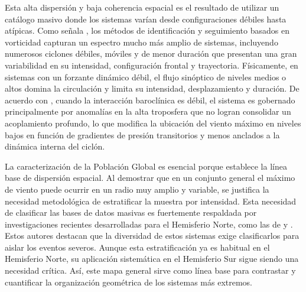 Esta alta dispersión y baja coherencia espacial es el resultado de utilizar un catálogo masivo donde los sistemas varían desde configuraciones débiles hasta atípicas. Como señala \citet{sinclair1994objective}, los métodos de identificación y seguimiento basados en vorticidad capturan un espectro mucho más amplio de sistemas, incluyendo numerosos ciclones débiles, móviles y de menor duración que presentan una gran variabilidad en su intensidad, configuración frontal y trayectoria. Físicamente, en sistemas con un forzante dinámico débil, el flujo sinóptico de niveles medios o altos domina la circulación y limita su intensidad, desplazamiento y duración. De acuerdo con \citet{hoskins2005new}, cuando la interacción baroclínica es débil, el sistema es gobernado principalmente por anomalías en la alta troposfera que no logran consolidar un acoplamiento profundo, lo que modifica la ubicación del viento máximo en niveles bajos en función de gradientes de presión transitorios y menos anclados a la dinámica interna del ciclón.

La caracterización de la Población Global es esencial porque establece la línea base de dispersión espacial. Al demostrar que en un conjunto general el máximo de viento puede ocurrir en un radio muy amplio y variable, se justifica la necesidad metodológica de estratificar la muestra por intensidad. Esta necesidad de clasificar las bases de datos masivas es fuertemente respaldada por investigaciones recientes desarrolladas para el Hemisferio Norte, como las de \citet{corner2025classification} y \citet{eisenstein2023identification}. Estos autores destacan que la diversidad de estos sistemas exige clasificarlos para aislar los eventos severos. Aunque esta estratificación ya es habitual en el Hemisferio Norte, su aplicación sistemática en el Hemisferio Sur sigue siendo una necesidad crítica. Así, este mapa general sirve como línea base para contrastar y cuantificar la organización geométrica de los sistemas más extremos.

